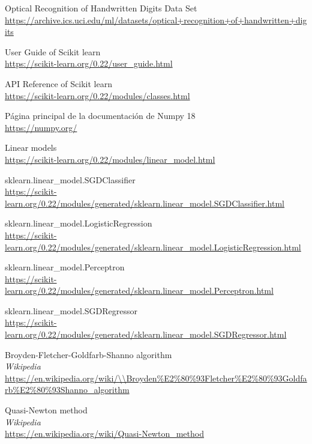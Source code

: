\begin{thebibliography}{9}

Optical Recognition of Handwritten Digits Data Set
\\\url{https://archive.ics.uci.edu/ml/datasets/optical+recognition+of+handwritten+digits}

User Guide of Scikit learn
\\\url{https://scikit-learn.org/0.22/user\_guide.html}

API Reference of Scikit learn
\\\url{https://scikit-learn.org/0.22/modules/classes.html}

Página principal de la documentación de Numpy 18
\\\url{https://numpy.org/}

Linear models
\\\url{https://scikit-learn.org/0.22/modules/linear\_model.html}

sklearn.linear\_model.SGDClassifier
\\\url{https://scikit-learn.org/0.22/modules/generated/sklearn.linear\_model.SGDClassifier.html}

sklearn.linear\_model.LogisticRegression
\\\url{https://scikit-learn.org/0.22/modules/generated/sklearn.linear\_model.LogisticRegression.html}

sklearn.linear\_model.Perceptron
\\\url{https://scikit-learn.org/0.22/modules/generated/sklearn.linear\_model.Perceptron.html}

sklearn.linear\_model.SGDRegressor
\\\url{https://scikit-learn.org/0.22/modules/generated/sklearn.linear\_model.SGDRegressor.html}

Broyden-Fletcher-Goldfarb-Shanno algorithm
\\\textit{Wikipedia}
\\\url{https://en.wikipedia.org/wiki/\\Broyden\%E2\%80\%93Fletcher\%E2\%80\%93Goldfarb\%E2\%80\%93Shanno\_algorithm}

Quasi-Newton method
\\\textit{Wikipedia}
\\\url{https://en.wikipedia.org/wiki/Quasi-Newton\_method}


\end{thebibliography}
